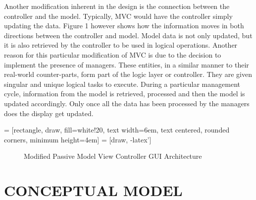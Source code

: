 \documentclass[10pt,twocolumn]{witseiepaper}
\begin{document}
Another modification inherent in the design is the connection between the controller and the model. Typically, MVC would have the controller simply updating the data. Figure 1 however shows how the information moves in both directions between the controller and model. Model data is not only updated, but it is also retrieved by the controller to be used in logical operations. Another reason for this particular modification of MVC is due to the decision to implement the presence of managers. These entities, in a similar manner to their real-world counter-parts, form part of the logic layer or controller. They are given singular and unique logical tasks to execute. During a particular management cycle, information from the model is retrieved, processed and then the model is updated accordingly. Only once all the data has been processed by the managers does the display get updated.  

 = [rectangle, draw, fill=white!20, 
    text width=6em, text centered, rounded corners, minimum height=4em]
 = [draw, -latex']

\begin{figure}[h]
\centering
{}
\caption{Modified Passive Model View Controller GUI Architecture}
\end{figure}



%
\section{CONCEPTUAL MODEL} %
\end{document}
